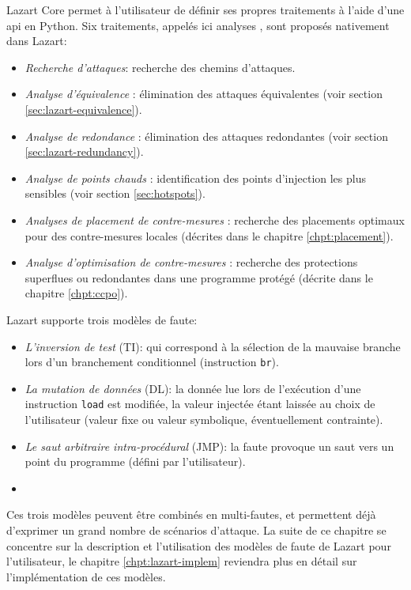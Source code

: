         Lazart Core permet à l'utilisateur de définir ses propres traitements à l'aide d'une \gls{api} en Python. Six traitements, appelés ici \og analyses \fg{}, sont proposés nativement dans Lazart:
        \begin{itemize}
            \item \textit{Recherche d'attaques}: recherche des chemins d'attaques.
            \item \textit{Analyse d'équivalence} : élimination des attaques \og équivalentes \fg{} (voir section \ref{sec:lazart-equivalence}).
            \item \textit{Analyse de redondance} : élimination des attaques \og redondantes \fg{} (voir section \ref{sec:lazart-redundancy}).
            \item \textit{Analyse de points chauds} : identification des points d'injection les plus sensibles (voir section \ref{sec:hotspots}).
            \item \textit{Analyses de placement de contre-mesures} : recherche des placements optimaux pour des contre-mesures \og locales \fg{} (décrites dans le chapitre \ref{chpt:placement}).
            \item \textit{Analyse d'optimisation de contre-mesures} : recherche des protections superflues ou redondantes dans une programme protégé  (décrite dans le chapitre \ref{chpt:ccpo}).
        \end{itemize}
            
        Lazart supporte trois modèles de faute: 
        \begin{itemize}
            \item \textit{L'inversion de test} (\gls{TI}): qui correspond à la sélection de la mauvaise branche lors d'un branchement conditionnel (instruction \texttt{br}).
            \item \textit{La mutation de données} (\gls{DL}): la donnée lue lors de l'exécution d'une instruction \texttt{load} est modifiée, la valeur injectée étant laissée au choix de l'utilisateur (valeur fixe ou valeur symbolique, éventuellement contrainte).
            \item \textit{Le saut arbitraire intra-procédural} (\gls{JMP}): la faute provoque un saut vers un point du programme (défini par l'utilisateur).
            \item[]
        \end{itemize}
        
        Ces trois modèles peuvent être combinés en multi-fautes, et permettent déjà d'exprimer un grand nombre de scénarios d'attaque.
        La suite de ce chapitre se concentre sur la description et l'utilisation des modèles de faute de Lazart pour l'utilisateur, le chapitre \ref{chpt:lazart-implem} reviendra plus en détail sur l'implémentation de ces modèles.
        
